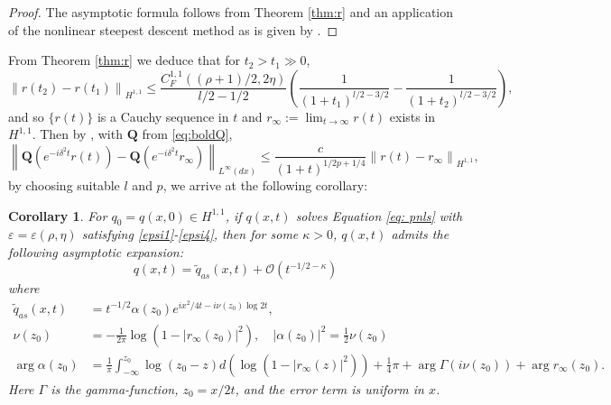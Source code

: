 \documentclass{amsart}
\theoremstyle{plain}
\newtheorem{corollary}[theorem]{Corollary}
\theoremstyle{remark}
\numberwithin{equation}{section}
\begin{document}
\begin{proof}
    The asymptotic formula follows from Theorem \ref{thm:r} and an application of the nonlinear steepest descent method as is given by
    \cite{DMM}.
\end{proof}
From Theorem \ref{thm:r} we deduce that for $t_2>t_1\gg 0$,
\begin{equation}
    \left\|r\left(t_2\right)-r\left(t_1\right)\right\|_{H^{1,1}} \leqslant \frac{ C_{F}^{1,1}((\rho+1)/2, 2\eta)}{l/2-1/2}\left(\frac{1}{\left(1+t_1\right)^{l/2-3/2}}-\frac{1}{\left(1+t_2\right)^{l/2-3/2}}\right),
\end{equation}
and so $\lbrace r(t) \rbrace$ is a Cauchy sequence in $t$ and $r_\infty:=\lim _{t \rightarrow \infty} r(t)$ exists in $H^{1,1}$. Then by \cite[(4.21)]{DZ-2}, with $\mathbf{Q}$ from \eqref{eq:boldQ},
\begin{equation}
    \left\|\mathbf{Q}\left(e^{-i \delta^2 t} r(t)\right)-\mathbf{Q}\left(e^{-i \delta^2 t} r_{\infty}\right)\right\|_{L^{\infty}(d x)} \leqslant \frac{c}{(1+t)^{1 / 2 p+1 / 4}}\left\|r(t)-r_{\infty}\right\|_{H^{1,1}},
\end{equation}
by choosing suitable $l$ and $p$, we arrive at the following corollary:
\begin{corollary}
 For $q_0=q(x,0)\in H^{1,1}$, if  $q(x,t)$ solves Equation \eqref{eq: pnls} with $\varepsilon=\varepsilon(\rho, \eta)$ satisfying \eqref{epsi1}-\eqref{epsi4}, then for some $\kappa>0$, $q(x,t)$ admits the following asymptotic expansion:
  \begin{equation}
      q(x,t)=\tilde{q}_{as}(x,t)+\mathcal{O}\left(t^{-1/2-\kappa}\right)
  \end{equation}
  where
  \begin{align*}
      \tilde{q}_{as}(x,t)&=t^{-1 / 2} \alpha\left(z_0\right) e^{i x^2 / 4 t-i \nu\left(z_0\right) \log 2 t},\\
      \nu\left(z_0\right) &=-\frac{1}{2 \pi} \log \left(1-\left|r_\infty\left(z_0\right)\right|^2\right), \quad \left|\alpha\left(z_0\right)\right|^2=\frac{1}{2} \nu\left(z_0\right)\\
      \arg \alpha\left(z_0\right)&=\frac{1}{\pi} \int_{-\infty}^{z_0} \log \left(z_0-z\right) d\left(\log \left(1-\left|r_\infty(z)\right|^2\right)\right)+\frac{1}{4} \pi+\arg \Gamma\left(i \nu\left(z_0\right)\right)+\arg r_\infty\left( z_0\right).
      \end{align*}
      Here $\Gamma $ is the gamma-function, $z_0=x / 2 t$,  and the error term is uniform in $x$.
\end{corollary}
\end{document}
